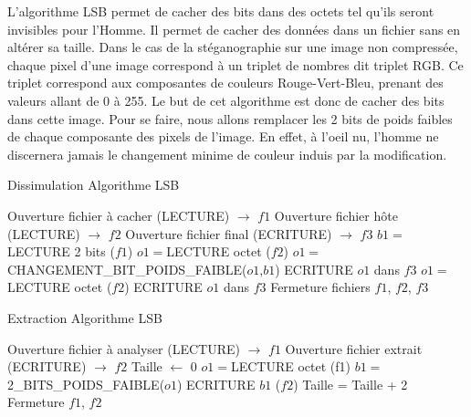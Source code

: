 \documentclass[11pt]{article}
\begin{document}
L'algorithme LSB permet de cacher des bits dans des octets tel qu'ils seront
invisibles pour l'Homme. Il permet de cacher des données dans un fichier sans en
altérer sa taille. Dans le cas de la stéganographie sur une image non compressée,
chaque pixel d'une image correspond à un triplet de nombres dit triplet RGB. Ce
triplet correspond aux composantes de couleurs Rouge-Vert-Bleu, prenant des
valeurs allant de 0 à 255. Le but de cet algorithme est donc de cacher des bits 
dans cette image. Pour se faire, nous allons remplacer les 2 bits de poids 
faibles de chaque composante des pixels de l'image. En effet, à l'oeil nu, 
l'homme ne discernera jamais le changement minime de couleur induis par la 
modification. 

\begin{minipage}{.5\textwidth}
\begin{algorithm}[H]
\caption{Dissimulation Algorithme LSB}
\begin{algorithmic}
\STATE \footnotesize Ouverture fichier à cacher (LECTURE) $\rightarrow$ $f1$
\STATE Ouverture fichier hôte (LECTURE) $\rightarrow$ $f2$
\STATE Ouverture fichier final (ECRITURE) $\rightarrow$ $f3$
\STATE $b1 = $LECTURE 2 bits ($f1$)
\STATE $o1 = $LECTURE octet ($f2$)
\STATE $o1 = $CHANGEMENT\_BIT\_POIDS\_FAIBLE($o1$,$b1$)
\STATE ECRITURE $o1$ dans $f3$
\ENDWHILE
{}
\STATE $o1 =$LECTURE octet ($f2$)
\STATE ECRITURE $o1$ dans $f3$
\ENDWHILE
\STATE Fermeture fichiers $f1$, $f2$, $f3$
\end{algorithmic}
\end{algorithm}
\normalsize
\end{minipage}
\begin{minipage}{.5\textwidth}
\begin{algorithm}[H]
\caption{Extraction Algorithme LSB}
\begin{algorithmic}
\STATE \footnotesize Ouverture fichier à analyser (LECTURE) $\rightarrow$ $f1$
\STATE Ouverture fichier extrait (ECRITURE) $\rightarrow$ $f2$
\STATE Taille $\leftarrow$ 0
\STATE $o1 = $LECTURE octet (f1)
\STATE $b1 = $2\_BITS\_POIDS\_FAIBLE($o1$)
\STATE ECRITURE $b1$ ($f2$)
\STATE Taille = Taille + 2
\ENDWHILE
\STATE Fermeture $f1$, $f2$
\end{algorithmic}
\end{algorithm}
\normalsize
\end{minipage}
\end{document}
